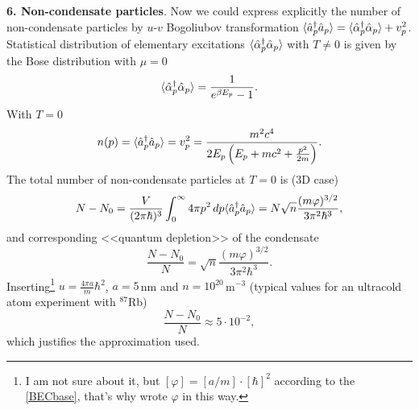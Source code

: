 
\textbf{6. Non-condensate particles}.  Now we could express explicitly the number of non-condensate particles by $u$-$v$ Bogoliubov transformation $\langle \hat{a}^{\dag}_p \hat{a}_p \rangle = \langle \hat{\alpha}_p^{\dag} \hat{\alpha}_p\rangle + v_p^2$. Statistical distribution of elementary excitations $\langle \hat{\alpha}_p^{\dag} \hat{\alpha}_p\rangle$ with $T \neq 0$ is given by the Bose distribution with $\mu=0$
\begin{equation*}
	\langle \hat{\alpha}_p^{\dag} \hat{\alpha}_p\rangle = \frac{1}{e^{\beta E_p}-1}.
\end{equation*}
With $T=0$
\begin{equation*}
	n(p) =  \langle \hat{a}_p^{\dag} \hat{a}_p \rangle = v_p^2 =  \frac{ m^2 c^4}{2 E_p \left(
		E_p + m c^2 + \frac{p^2}{2m}
	\right)}.
\end{equation*}
The total number of non-condensate particles at $T=0$ is (3D case)
\begin{equation*}
	N- N_0 = \frac{V}{(2\pi \hbar)^3} \int_{0}^{\infty}  4 \pi p^2 \, d p  \langle \hat{a}_p^{\dag} \hat{a}_p \rangle = N \sqrt{n} \frac{(m \varphi)^{3/2}}{3 \pi^2 \hbar^3},
\end{equation*}
and  corresponding <<quantum depletion>> of the condensate
\begin{equation*}
	\frac{N-N_0}{N} = \sqrt{n} \frac{(m \varphi)^{3/2}}{3 \pi^2 \hbar^3}.
\end{equation*}
Inserting\footnote{
	I am not sure about it, but $[\varphi]= [a/m] \cdot [\hbar]^2$ according to the \eqref{BECbase}, that's why wrote $\varphi$ in this way.
} $u=\frac{4\pi a}{m} \hbar^2$, $a=5\,$nm and $n = 10^{20}\,$m${}^{-3}$ (typical values for an ultracold atom experiment with ${}^{87}$Rb) 
\begin{equation*}
	\frac{N-N_0}{N} \approx 5 \cdot 10^{-2},
\end{equation*}
which justifies the approximation used.